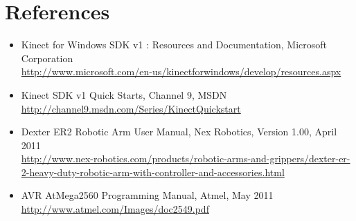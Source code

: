 \documentclass[a4paper,11pt]{article}
\begin{document}
\section{References}
\begin{itemize}
\item Kinect for Windows SDK v1 : Resources and Documentation, Microsoft Corporation\\ \url{http://www.microsoft.com/en-us/kinectforwindows/develop/resources.aspx}
\item Kinect SDK v1 Quick Starts, Channel 9, MSDN\\ \url{http://channel9.msdn.com/Series/KinectQuickstart} 
\item Dexter ER2 Robotic Arm User Manual, Nex Robotics, Version 1.00, April 2011\\ \url{http://www.nex-robotics.com/products/robotic-arms-and-grippers/dexter-er-2-heavy-duty-robotic-arm-with-controller-and-accessories.html}
\item AVR AtMega2560 Programming Manual, Atmel, May 2011 \\ \url{http://www.atmel.com/Images/doc2549.pdf}
\end{itemize}
\end{document}
